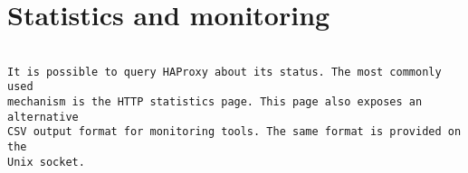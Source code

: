 
\chapter{Statistics and monitoring}

\begin{verbatim}

It is possible to query HAProxy about its status. The most commonly used
mechanism is the HTTP statistics page. This page also exposes an alternative
CSV output format for monitoring tools. The same format is provided on the
Unix socket.


\end{verbatim}
